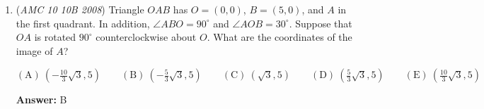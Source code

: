 \begin{enumerate}
 



\textbf{Solution 2}

Let $a_1, a_2, a_3, \cdots, a_n$ be the terms of the sequence. We know $\frac{a_1 + a_2 + a_3 + \cdots + a_n}{n} = n$, so we must have $a_1 + a_2 + a_3 + \cdots + a_n = n^2$. The sum of consecutive odd numbers down to $1$ is a perfect square, if you don't believe me, try drawing squares with the sum, so $a_1 = 1, a_2 = 3, a_3 = 5, \cdots , a_n = 2(n-1) + 1$, so the answer is $a_{2008} = 2(2007) + 1 = \boxed{\textbf{(B) 4015}}$.

 



\textbf{Solution 3}

Let the mean be $\frac{(a)+(a+d)+(a+2d)+...+(a+(n-1)) \cdot d)}{n}$$=\frac{n \cdot a}{n} + \frac{(1+2+3+...+(n-1)) \cdot d}{n}$$=a + \frac{n \cdot (n-1) \cdot d}{2n}$$=a+ \frac{(n-1) \cdot d}{2}$

 Note that this is also equal to n

 $a+ \frac{(n-1) \cdot d}{2}=n$$\therefore 2a+ (n-1) \cdot d=2n$

 1st term + nth term $=2n=2 \cdot 2008=4016$Now note that, from previous solutions, the first term is 1, hence the 2008th term is $4016-1=\boxed{\textbf{(B) 4015}}$




\textbf{Solution 4 (Using Answer Choices)}

From inspection, we see that the sum of the sequence is $n^2$. We also notice that $n^2$ is the sum of the first $n$ odd integers. Because $4015$ is the only odd integer, $\boxed{\textbf{(B) 4015}}$ is the answer.

 


 


	\item (\textit{AMC 10 10B 2008}) Triangle $OAB$ has $O=(0,0)$, $B=(5,0)$, and $A$ in the first quadrant. In addition, $\angle ABO=90^\circ$ and $\angle AOB=30^\circ$. Suppose that $OA$ is rotated $90^\circ$ counterclockwise about $O$. What are the coordinates of the image of $A$? 


 $\mathrm{(A)}\ \left( - \frac {10}{3}\sqrt {3},5\right) \qquad \mathrm{(B)}\ \left( - \frac {5}{3}\sqrt {3},5\right) \qquad \mathrm{(C)}\ \left(\sqrt {3},5\right) \qquad \mathrm{(D)}\ \left(\frac {5}{3}\sqrt {3},5\right) \qquad \mathrm{(E)}\ \left(\frac {10}{3}\sqrt {3},5\right)$

 \textbf{Answer: }B




\end{enumerate}

